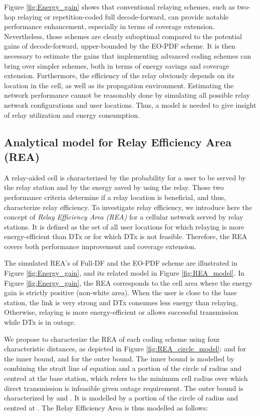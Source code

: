\documentclass[journal]{IEEEtran}
\theoremstyle{definition}
\begin{document}
Figure \ref{fig:Energy_gain} shows that conventional relaying schemes, such as two-hop relaying or repetition-coded full decode-forward, can provide notable performance enhancement, especially in terms of coverage extension. Nevertheless, those schemes are clearly suboptimal compared to the potential gains of decode-forward, upper-bounded by the EO-PDF scheme. It is then necessary to estimate the gains that implementing advanced coding schemes can bring over simpler schemes, both in terms of energy savings and coverage extension. Furthermore, the efficiency of the relay obviously depends on its location in the cell, as well as its propagation environment. 
Estimating the network performance cannot be reasonably done by simulating all possible relay network configurations and user locations. Thus, a model is needed to give insight of relay utilization and energy consumption.



\subsection{Analytical model for Relay Efficiency Area (REA)}

A relay-aided cell is characterized by the probability for a user to be served by the relay station and by the energy saved by using the relay. Those two performance criteria determine if a relay location is beneficial, and thus, characterize relay efficiency.
To investigate relay efficiency, we introduce here the concept of \textit{Relay Efficiency Area (REA)} for a cellular network served by relay stations. It is defined as the set of all user locations for which relaying is more energy-efficient than DTx or for which DTx is not feasible. Therefore, the REA covers both performance improvement and coverage extension.  

The simulated REA's of Full-DF and the EO-PDF scheme are illustrated in Figure \ref{fig:Energy_gain}, and its related model in Figure \ref{fig:REA_model}. In Figure \ref{fig:Energy_gain}, the REA corresponds to the cell area where the energy gain is strictly positive (non-white area).
When the user is close to the base station, the  link is very strong and DTx consumes less energy than relaying. Otherwise, relaying is more energy-efficient or allows successful transmission while DTx is in outage.

We propose to characterize the REA of each coding scheme using four characteristic distances, as depicted in Figure \ref{fig:REA_circle_model}:  and  for the inner bound,  and  for the outer bound. The inner bound is modelled by combining the strait line of equation   and a portion of the circle of radius  and centred at the base station, which refers to the minimum cell radius over which direct transmission is infeasible given outage requirement. The outer bound is characterized by  and . It is modelled by a portion of the circle of radius  and centred at . The Relay Efficiency Area is thus modelled as follows:
\end{document}
